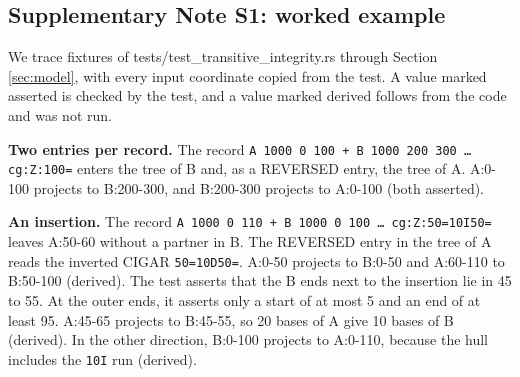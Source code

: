 
\subsection*{Supplementary Note S1: worked example}

We trace fixtures of tests/test\_transitive\_integrity.rs through Section \ref{sec:model}, with every input coordinate copied from the test.
A value marked asserted is checked by the test, and a value marked derived follows from the code and was not run.

\textbf{Two entries per record.}
The record \texttt{A 1000 0 100 + B 1000 200 300 \dots{} cg:Z:100=} enters the tree of B and, as a REVERSED entry, the tree of A.
A:0-100 projects to B:200-300, and B:200-300 projects to A:0-100 (both asserted).

\textbf{An insertion.}
The record \texttt{A 1000 0 110 + B 1000 0 100 \dots{} cg:Z:50=10I50=} leaves A:50-60 without a partner in B.
The REVERSED entry in the tree of A reads the inverted CIGAR \texttt{50=10D50=}.
A:0-50 projects to B:0-50 and A:60-110 to B:50-100 (derived).
The test asserts that the B ends next to the insertion lie in 45 to 55.
At the outer ends, it asserts only a start of at most 5 and an end of at least 95.
A:45-65 projects to B:45-55, so 20 bases of A give 10 bases of B (derived).
In the other direction, B:0-100 projects to A:0-110, because the hull includes the \texttt{10I} run (derived).


